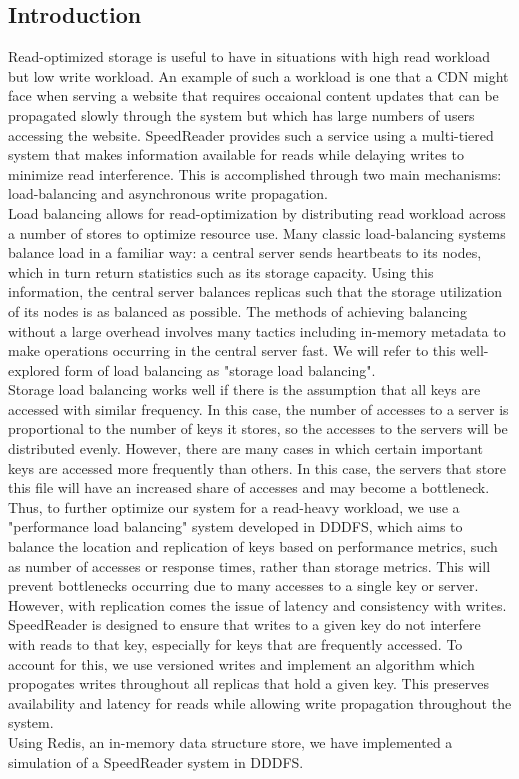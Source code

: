 \documentclass[twoside]{article}
\begin{document}
\begin{multicols}{2} %

\section{Introduction}

Read-optimized storage is useful to have in situations with high read workload but low write workload. An example of such a workload is one that a CDN might face when serving a website that requires occaional content updates that can be propagated slowly through the system but which has large numbers of users accessing the website. SpeedReader provides such a service using a multi-tiered system that makes information available for reads while delaying writes to minimize read interference. This is accomplished through two main mechanisms: load-balancing and asynchronous write propagation.\\\indent
Load balancing allows for read-optimization by distributing read workload across a number of stores to optimize resource use. Many classic load-balancing systems balance load in a familiar way: a central server sends heartbeats to its nodes, which in turn return statistics such as its storage capacity.  Using this information, the central server balances replicas such that the storage utilization of its nodes is as balanced as possible. The methods of achieving balancing without a large overhead involves many tactics including in-memory metadata to make operations occurring in the central server fast. We will refer to this well-explored form of load balancing as "storage load balancing".\\\indent
Storage load balancing works well if there is the assumption that all keys are accessed with similar frequency. In this case, the number of accesses to a server is proportional to the number of keys it stores, so the accesses to the servers will be distributed evenly. However, there are many cases in which certain important keys are accessed more frequently than others. In this case, the servers that store this file will have an increased share of accesses and may become a bottleneck. Thus, to further optimize our system for a read-heavy workload, we use a "performance load balancing" system developed in DDDFS, which aims to balance the location and replication of keys based on performance metrics, such as number of accesses or response times, rather than storage metrics. This will prevent bottlenecks occurring due to many accesses to a single key or server. \\\indent
However, with replication comes the issue of latency and consistency with writes. SpeedReader is designed to ensure that writes to a given key do not interfere with reads to that key, especially for keys that are frequently accessed. To account for this, we use versioned writes and implement an algorithm which propogates writes throughout all replicas that hold a given key. This preserves availability and latency for reads while allowing write propagation throughout the system.\\\indent
Using Redis, an in-memory data structure store, we have implemented a simulation of a SpeedReader system in DDDFS. 


\end{multicols}
\end{document}
